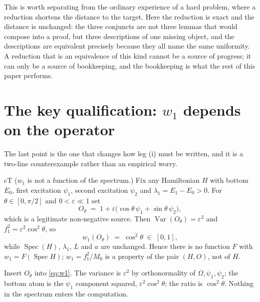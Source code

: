 This is worth separating from the ordinary experience of a hard problem, where a reduction shortens
the distance to the target. Here the reduction is exact and the distance is unchanged: the three
conjuncts are not three lemmas that would compose into a proof, but three descriptions of one
missing object, and the descriptions are equivalent precisely because they all name the same
uniformity. A reduction that is an equivalence of this kind cannot be a source of progress; it can
only be a source of bookkeeping, and the bookkeeping is what the rest of this paper performs.

\section{The key qualification: \texorpdfstring{$w_1$}{w1} depends on the operator}
\label{sec:reduction-operator}

The last point is the one that changes how leg (i) must be written, and it is a two-line
counterexample rather than an empirical worry.

\begin{claimbox}{cT}
 ($w_1$ is not a function of the spectrum.) Fix any Hamiltonian $H$ with
bottom $E_0$, first excitation $\psi_1$, second excitation $\psi_2$ and $\lambda_1=E_1-E_0>0$. For
$\theta\in[0,\pi/2]$ and $0<\varepsilon\ll1$ set
\[
  O_\theta \;=\; 1+\varepsilon\bigl(\cos\theta\,\psi_1+\sin\theta\,\psi_2\bigr),
\]
which is a legitimate non-negative source. Then $\operatorname{Var}(O_\theta)=\varepsilon^2$ and
$f_1^2=\varepsilon^2\cos^2\theta$, so
\[
  w_1(O_\theta)\;=\;\cos^2\theta\;\in\;[0,1],
\]
while $\operatorname{Spec}(H)$, $\lambda_1$, $L$ and $a$ are unchanged. Hence there is no function $F$
with $w_1=F(\operatorname{Spec}H)$; $w_1=f_1^2/M_0$ is a property of the pair $(H,O)$, not of $H$.
\end{claimbox}
\begin{proofx}
Insert $O_\theta$ into \eqref{eq:w1}. The variance is $\varepsilon^2$ by orthonormality of
$\Omega,\psi_1,\psi_2$; the bottom atom is the $\psi_1$ component squared, $\varepsilon^2\cos^2\theta$;
the ratio is $\cos^2\theta$. Nothing in the spectrum enters the computation.
\end{proofx}

